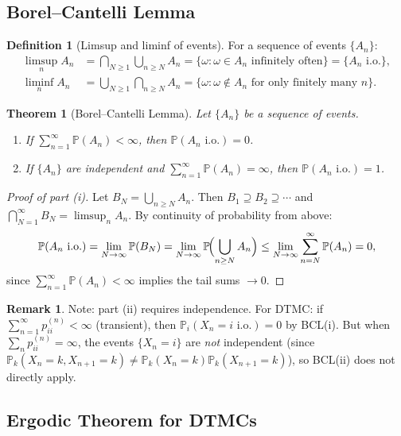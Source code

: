 \documentclass[12pt, a4paper]{article}
\theoremstyle{definition}
\newtheorem{definition}{Definition}[section]
\newtheorem{remark}{Remark}[section]
\theoremstyle{plain}
\newtheorem{theorem}{Theorem}[section]
\newcommand{\PP}{\mathbb{P}}
\begin{document}
\subsection{Borel--Cantelli Lemma}

\begin{definition}[Limsup and liminf of events]
For a sequence of events $\{A_n\}$:
\begin{align*}
  \limsup_{n} A_n &= \bigcap_{N\ge 1}\bigcup_{n\ge N} A_n = \{\omega: \omega\in A_n\text{ infinitely often}\} = \{A_n\text{ i.o.}\},\\
  \liminf_{n} A_n &= \bigcup_{N\ge 1}\bigcap_{n\ge N} A_n = \{\omega:\omega\notin A_n\text{ for only finitely many }n\}.
\end{align*}
\end{definition}

\begin{theorem}[Borel--Cantelli Lemma]
Let $\{A_n\}$ be a sequence of events.
\begin{enumerate}[label=(\roman*)]
  \item If $\sum_{n=1}^\infty \PP(A_n)<\infty$, then $\PP(A_n\text{ i.o.})=0$.
  \item If $\{A_n\}$ are independent and $\sum_{n=1}^\infty\PP(A_n)=\infty$, then $\PP(A_n\text{ i.o.})=1$.
\end{enumerate}
\end{theorem}

\begin{proof}[Proof of part (i)]
Let $B_N = \bigcup_{n\ge N}A_n$. Then $B_1\supseteq B_2\supseteq\cdots$ and $\bigcap_{N=1}^\infty B_N = \limsup_n A_n$. By continuity of probability from above:
\[
  \PP(A_n\text{ i.o.}) = \lim_{N\to\infty}\PP(B_N) = \lim_{N\to\infty}\PP\!\Bigl(\bigcup_{n\ge N}A_n\Bigr) \le \lim_{N\to\infty}\sum_{n=N}^\infty\PP(A_n) = 0,
\]
since $\sum_{n=1}^\infty\PP(A_n)<\infty$ implies the tail sums $\to 0$.
\end{proof}

\begin{remark}
Note: part (ii) requires independence. For DTMC: if $\sum_{n=1}^\infty p_{ii}^{(n)}<\infty$ (transient), then $\PP_i(X_n=i\text{ i.o.})=0$ by BCL(i). But when $\sum_{n}p_{ii}^{(n)}=\infty$, the events $\{X_n=i\}$ are \emph{not} independent (since $\PP_k(X_n=k, X_{n+1}=k)\ne\PP_k(X_n=k)\PP_k(X_{n+1}=k)$), so BCL(ii) does not directly apply.
\end{remark}

\subsection{Ergodic Theorem for DTMCs}
\end{document}
